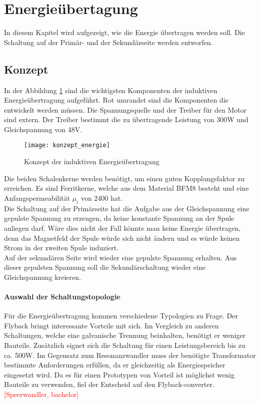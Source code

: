 \section{Energieübertagung}\label{sec:Energie}
In diesem Kapitel wird aufgezeigt, wie die Energie übertragen werden soll. Die Schaltung auf der Primär- und der Sekundärseite werden entworfen.

\subsection{Konzept}
In der Abbildung \ref{fig:konzept_energie} sind die wichtigsten Komponenten der induktiven Energieübertragung aufgeführt. Rot umrandet sind die Komponenten die entwickelt werden müssen. Die Spannungsquelle und der Treiber für den Motor sind extern. Der Treiber bestimmt die zu übertragende Leistung von 300W und Gleichspannung von 48V.

\begin{figure}[h]
	\centering
	\texttt{[image: konzept\_energie]}
	\caption{Konzept der induktiven Energieübertragung}\label{fig:konzept_energie}
\end{figure}

Die beiden Schalenkerne werden benötigt, um einen guten Kopplungsfaktor zu erreichen. Es sind Ferritkerne, welche aus dem Material BFM8 besteht und eine Anfangspermeabilität $ \mu_{i} $ von 2400 hat.\\ Die Schaltung auf der Primärseite hat die Aufgabe aus der Gleichspannung eine gepulste Spannung zu erzeugen, da keine konstante Spannung an der Spule anliegen darf. Wäre dies nicht der Fall könnte man keine Energie übertragen, denn das Magnetfeld der Spule würde sich nicht ändern und es würde keinen Strom in der zweiten Spule induziert. \\
Auf der sekundären Seite wird wieder eine gepulste Spannung erhalten. Aus dieser gepulsten Spannung soll die Sekundärschaltung wieder eine Gleichspannung kreieren.

\paragraph{Auswahl der Schaltungstopologie}
Für die Energieübertragung kommen verschiedene Typologien zu Frage. Der Flyback bringt interessante Vorteile mit sich. Im Vergleich zu anderen Schaltungen, welche eine galvanische Trennung beinhalten, benötigt er weniger Bauteile. Zusätzlich eignet sich die Schaltung für einen Leistungsbereich bis zu ca. 500W. Im Gegensatz zum Resonanzwandler muss der benötigte Transformator bestimmte Anforderungen erfüllen, da er gleichzeitig als Energiespeicher eingesetzt wird. Da es für einen Prototypen von Vorteil ist möglichst wenig Bauteile zu verwenden, fiel der Entscheid auf den Flyback-converter.\textcolor{red}{[Speerwandler, bachelor]}

